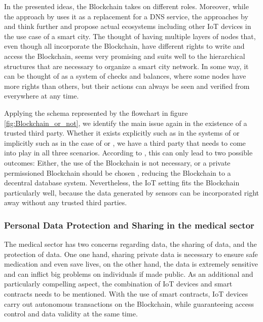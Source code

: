 In the presented ideas, the Blockchain takes on different roles. Moreover, while the approach by \cite{Rowan2017} uses it as a replacement for a DNS service, the approaches by \cite{DorriSteger2017} and \cite{Sharma2017} think further and propose actual ecosystems including other IoT devices in the use case of a smart city.
The thought of having multiple layers of nodes that, even though all incorporate the Blockchain, have different rights to write and access the Blockchain, seems very promising and suits well to the hierarchical structures that are necessary to organize a smart city network. In some way, it can be thought of as a system of checks and balances, where some nodes have more rights than others, but their actions can always be seen and verified from everywhere at any time.

Applying the schema represented by the flowchart in figure \ref{fig:Blockchain_or_not}, we identify the main issue again in the existence of a trusted third party. Whether it exists explicitly such as in the systems of \cite{Sharma2017} or implicitly such as in the case of \cite{Rowan2017} or \cite{DorriSteger2017}, we have a third party that needs to come into play in all three scenarios.
According to \cite{Wust2017}, this can only lead to two possible outcomes: Either, the use of the Blockchain is not necessary, or a private permissioned Blockchain should be chosen \cite{Wust2017}, reducing the Blockchain to a decentral database system.
Nevertheless, the IoT setting fits the Blockchain particularly well, because the data generated by sensors can be incorporated right away without any trusted third parties.

\subsubsection{Personal Data Protection and Sharing in the medical sector}
The medical sector has two concerns regarding data, the sharing of data, and the protection of data. One one hand, sharing private data is necessary to ensure safe medication and even save lives, on the other hand, the data is extremely sensitive and can inflict big problems on individuals if made public.
As an additional and particularly compelling aspect, the combination of IoT devices and smart contracts needs to be mentioned. With the use of smart contracts, IoT devices carry out autonomous transactions on the Blockchain, while guaranteeing access control and data validity at the same time.

